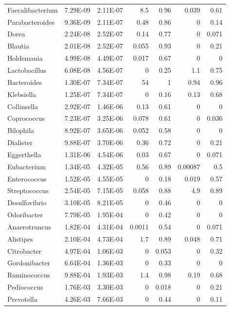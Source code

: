 {\begin{longtable}{ | l | r | r | r | r | r | r  | }
		
		Faecalibacterium & 7.29E-09 & 2.11E-07 & 8.5 & 0.96 & 0.039 & 0.61 \\ 
		Parabacteroides & 9.36E-09 & 2.11E-07 & 0.48 & 0.86 & 0 & 0.14 \\ 
		Dorea & 2.24E-08 & 2.52E-07 & 0.14 & 0.77 & 0 & 0.071 \\ 
		Blautia & 2.01E-08 & 2.52E-07 & 0.055 & 0.93 & 0 & 0.21 \\ 
		Holdemania & 4.99E-08 & 4.49E-07 & 0.017 & 0.67 & 0 & 0 \\ 
		Lactobacillus & 6.08E-08 & 4.56E-07 & 0 & 0.25 & 1.1 & 0.75 \\ 
		Bacteroides & 1.30E-07 & 7.34E-07 & 54 & 1 & 0.94 & 0.96 \\ 
		Klebsiella & 1.25E-07 & 7.34E-07 & 0 & 0.16 & 0.13 & 0.68 \\ 
		Collinsella & 2.92E-07 & 1.46E-06 & 0.13 & 0.61 & 0 & 0 \\ 
		Coprococcus & 7.23E-07 & 3.25E-06 & 0.078 & 0.61 & 0 & 0.036 \\ 
		Bilophila & 8.92E-07 & 3.65E-06 & 0.052 & 0.58 & 0 & 0 \\ 
		Dialister & 9.88E-07 & 3.70E-06 & 0.36 & 0.72 & 0 & 0.21 \\ 
		Eggerthella & 1.31E-06 & 4.54E-06 & 0.03 & 0.67 & 0 & 0.071 \\ 
		Eubacterium & 1.34E-05 & 4.32E-05 & 0.56 & 0.89 & 0.00087 & 0.5 \\ 
		Enterococcus & 1.52E-05 & 4.55E-05 & 0 & 0.18 & 0.019 & 0.57 \\ 
		Streptococcus & 2.54E-05 & 7.15E-05 & 0.058 & 0.88 & 4.9 & 0.89 \\ 
		Desulfovibrio & 3.10E-05 & 8.21E-05 & 0 & 0.46 & 0 & 0 \\ 
		Odoribacter & 7.79E-05 & 1.95E-04 & 0 & 0.42 & 0 & 0 \\ 
		Anaerotruncus & 1.82E-04 & 4.31E-04 & 0.0011 & 0.54 & 0 & 0.071 \\ 
		Alistipes & 2.10E-04 & 4.73E-04 & 1.7 & 0.89 & 0.048 & 0.71 \\ 
		Citrobacter & 4.97E-04 & 1.06E-03 & 0 & 0.053 & 0 & 0.32 \\ 
		Gordonibacter & 6.64E-04 & 1.36E-03 & 0 & 0.33 & 0 & 0 \\ 
		Ruminococcus & 9.88E-04 & 1.93E-03 & 1.4 & 0.98 & 0.19 & 0.68 \\ 
		Pediococcus & 1.76E-03 & 3.30E-03 & 0 & 0.018 & 0 & 0.21 \\ 
		Prevotella & 4.26E-03 & 7.66E-03 & 0 & 0.44 & 0 & 0.11 \\ 

\end{longtable}}
